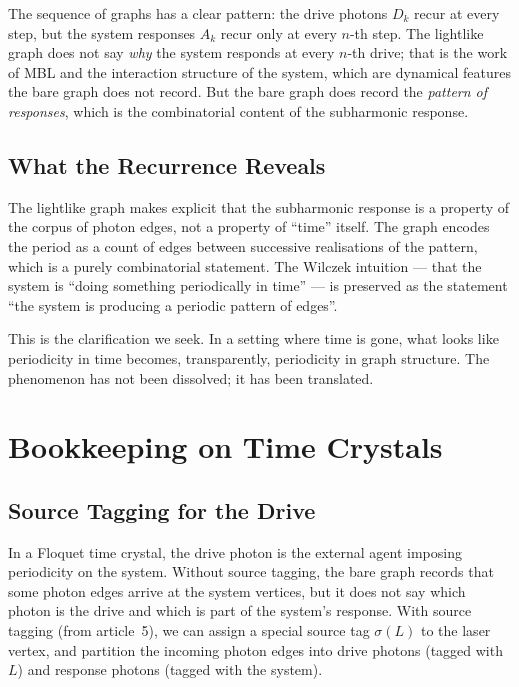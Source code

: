 \documentclass[11pt]{article}
\begin{document}
The sequence of graphs has a clear pattern: the drive photons $D_k$ recur at every step, but the system responses $A_k$ recur only at every $n$-th step. The lightlike graph does not say \emph{why} the system responds at every $n$-th drive; that is the work of MBL and the interaction structure of the system, which are dynamical features the bare graph does not record. But the bare graph does record the \emph{pattern of responses}, which is the combinatorial content of the subharmonic response.

\subsection{What the Recurrence Reveals}

The lightlike graph makes explicit that the subharmonic response is a property of the corpus of photon edges, not a property of ``time'' itself. The graph encodes the period as a count of edges between successive realisations of the pattern, which is a purely combinatorial statement. The Wilczek intuition --- that the system is ``doing something periodically in time'' --- is preserved as the statement ``the system is producing a periodic pattern of edges''.

This is the clarification we seek. In a setting where time is gone, what looks like periodicity in time becomes, transparently, periodicity in graph structure. The phenomenon has not been dissolved; it has been translated.

\section{Bookkeeping on Time Crystals}
\label{sec:bookkeeping}

\subsection{Source Tagging for the Drive}

In a Floquet time crystal, the drive photon is the external agent imposing periodicity on the system. Without source tagging, the bare graph records that some photon edges arrive at the system vertices, but it does not say which photon is the drive and which is part of the system's response. With source tagging (from article~5), we can assign a special source tag $\sigma(L)$ to the laser vertex, and partition the incoming photon edges into drive photons (tagged with $L$) and response photons (tagged with the system).
\end{document}
